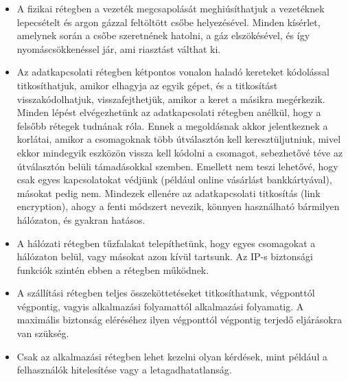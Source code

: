 \documentclass[12pt]{article}
\theoremstyle{plain}
\begin{document}
\begin{itemize}
    \item A fizikai rétegben a vezeték megcsapolását meghiúsíthatjuk a vezetéknek lepecsételt és argon gázzal feltöltött csőbe helyezésével. Minden kísérlet, amelynek során a csőbe szeretnének hatolni, a gáz elszökésével, és így nyomáscsökkenéssel jár, ami riasztást válthat ki.
    \item Az adatkapcsolati rétegben kétpontos vonalon haladó kereteket kódolással titkosíthatjuk, amikor elhagyja az egyik gépet, és a titkosítást visszakódolhatjuk, visszafejthetjük, amikor a keret a másikra megérkezik. Minden lépést elvégezhetünk az adatkapcsolati rétegben anélkül, hogy a felsőbb rétegek tudnának róla. Ennek a megoldásnak akkor jelentkeznek a korlátai, amikor a csomagoknak több útválasztón kell keresztüljutniuk, mivel ekkor mindegyik eszközön vissza kell kódolni a csomagot, sebezhetővé téve az útválasztón belüli támadásokkal szemben. Emellett nem teszi lehetővé, hogy csak egyes kapcsolatokat védjünk (például online vásárlást bankkártyával), másokat pedig nem. Mindezek ellenére az adatkapcsolati titkosítás (link encryption), ahogy a fenti módszert nevezik, könnyen használható bármilyen hálózaton, és gyakran hatásos.
    \item A hálózati rétegben tűzfalakat telepíthetünk, hogy egyes csomagokat a hálózaton belül, vagy másokat azon kívül tartsunk. Az IP-s biztonsági funkciók szintén ebben a rétegben működnek.
    \item A szállítási rétegben teljes összeköttetéseket titkosíthatunk, végponttól végpontig, vagyis alkalmazási folyamattól alkalmazási folyamatig. A maximális biztonság eléréséhez ilyen végponttól végpontig terjedő eljárásokra van szükség.
    \item Csak az alkalmazási rétegben lehet kezelni olyan kérdések, mint például a felhasználók hitelesítése vagy a letagadhatatlanság.
\end{itemize}{}

\vfill


\end{document}
